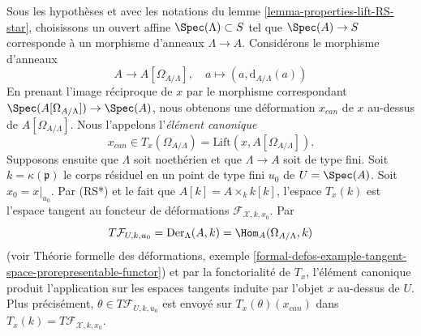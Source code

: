 \begin{remark}
\label{remark-canonical-element}
Sous les hypothèses et avec les notations du lemme
\ref{lemma-properties-lift-RS-star}, choisissons un ouvert affine
$\Spec(\Lambda) \subset S$ tel que $\Spec(A) \to S$ corresponde à un morphisme
d'anneaux $\Lambda \to A$. Considérons le morphisme d'anneaux
$$
A \longrightarrow A[\Omega_{A/\Lambda}],
\quad
a \longmapsto (a, \text{d}_{A/\Lambda}(a))
$$
En prenant l'image réciproque de $x$ par le morphisme correspondant
$\Spec(A[\Omega_{A/\Lambda}]) \to \Spec(A)$, nous obtenons une déformation
$x_{can}$ de $x$ au-dessus de $A[\Omega_{A/\Lambda}]$. Nous l'appelons
l'{\it élément canonique}
$$
x_{can} \in T_x(\Omega_{A/\Lambda}) = \text{Lift}(x, A[\Omega_{A/\Lambda}]).
$$
Supposons ensuite que $\Lambda$ soit noethérien et que $\Lambda \to A$ soit
de type fini. Soit $k = \kappa(\mathfrak p)$ le corps résiduel en un point de
type fini $u_0$ de $U = \Spec(A)$. Soit $x_0 = x|_{u_0}$. Par (RS*) et le fait
que $A[k] = A \times_k k[k]$, l'espace $T_x(k)$ est l'espace tangent au
foncteur de déformations $\mathcal{F}_{\mathcal{X}, k, x_0}$. Par
$$
T\mathcal{F}_{U, k, u_0} =
\text{Der}_\Lambda(A, k) = \Hom_A(\Omega_{A/\Lambda}, k)
$$
(voir Théorie formelle des déformations, exemple
\ref{formal-defos-example-tangent-space-prorepresentable-functor}) et par la
fonctorialité de $T_x$, l'élément canonique produit l'application sur les
espaces tangents induite par l'objet $x$ au-dessus de $U$. Plus précisément,
$\theta \in T\mathcal{F}_{U, k, u_0}$ est envoyé sur
$T_x(\theta)(x_{can})$ dans
$T_x(k) = T\mathcal{F}_{\mathcal{X}, k, x_0}$.
\end{remark}

